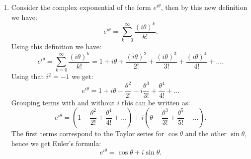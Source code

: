 \begin{enumerate}
  \item Consider the complex exponential of the form $e^{i\theta}$, then by this new definition we have:
        \[ e^{i\theta} = \sum_{k=0}^{\infty}\frac{(i\theta)^{k}}{k!}. \]
        Using this definition we have:
        \[ e^{i\theta} = \sum_{k=0}^{\infty}\frac{(i\theta)^{k}}{k!}=1 + i\theta + \frac{(i\theta)^{2}}{2!} + \frac{(i\theta)^{3}}{3!} + \frac{(i\theta)^{4}}{4!} + \hdots. \]
        Using that $i^{2}=-1$ we get:
        \[ e^{i\theta} = 1 + i\theta-\frac{\theta^{2}}{2!} - i\frac{\theta^{3}}{3!}+\frac{\theta^{4}}{4!}+\hdots \]
        Grouping terms with and without $i$ this can be written as:
        \[ e^{i\theta} = (1 - \frac{\theta^{2}}{2!} + \frac{\theta^{4}}{4!}+\hdots)+i(\theta - \frac{\theta^{3}}{3!}+\frac{\theta^{5}}{5!}-\hdots). \]
        The first terms correspond to the Taylor series for $\cos \theta$ and the other $\sin \theta$, hence we get Euler's formula:
        \[ e^{i\theta} = \cos\theta+i\sin\theta. \]

\end{enumerate}
